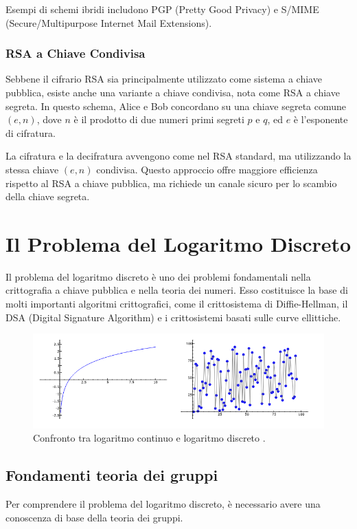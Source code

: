 \documentclass[a4paper,12pt]{report}
\begin{document}
Esempi di schemi ibridi includono PGP (Pretty Good Privacy) e S/MIME (Secure/Multipurpose Internet Mail Extensions).

\subsection{RSA a Chiave Condivisa}
Sebbene il cifrario RSA sia principalmente utilizzato come sistema a chiave pubblica, esiste anche una variante a chiave condivisa, nota come RSA a chiave segreta. In questo schema, Alice e Bob concordano su una chiave segreta comune $(e, n)$, dove $n$ è il prodotto di due numeri primi segreti $p$ e $q$, ed $e$ è l'esponente di cifratura.

La cifratura e la decifratura avvengono come nel RSA standard, ma utilizzando la stessa chiave $(e, n)$ condivisa. Questo approccio offre maggiore efficienza rispetto al RSA a chiave pubblica, ma richiede un canale sicuro per lo scambio della chiave segreta.
%
%
%
%
%
%
%
%
%
%
%
%
%
%
%
%
%
\chapter{Il Problema del Logaritmo Discreto}
Il problema del logaritmo discreto è uno dei problemi fondamentali nella crittografia a chiave pubblica e nella teoria dei numeri. Esso costituisce la base di molti importanti algoritmi crittografici, come il crittosistema di Diffie-Hellman, il DSA (Digital Signature Algorithm) e i crittosistemi basati sulle curve ellittiche.

\begin{figure}[ht]
    \centering
    \includegraphics[width=1.0\textwidth]{img/logarithms.png}
    \caption{Confronto tra logaritmo continuo e logaritmo discreto \cite{stein2008}.}
    \label{fig:logarithms}
\end{figure}

\section{Fondamenti teoria dei gruppi}
Per comprendere il problema del logaritmo discreto, è necessario avere una conoscenza di base della teoria dei gruppi.
\end{document}

